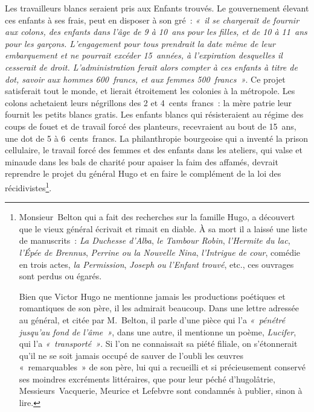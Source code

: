 \documentclass[french,twoside]{book} %
\begin{document}
Les travailleurs blancs seraient pris aux Enfants trouvés. Le gouvernement élevant ces enfants à ses frais, peut en disposer à son gré : \emph{« il se chargerait de fournir aux colons, des enfants dans l’âge de 9 à 10 ans pour les filles, et de 10 à 11 ans pour les garçons. L’engagement pour tous prendrait la date même de leur embarquement et ne pourrait excéder 15 années, à l’expiration desquelles il cesserait de droit. L’administration ferait alors compter à ces enfants à titre de dot, savoir aux hommes 600 francs, et aux femmes 500 francs »}. Ce projet satisferait tout le monde, et lierait étroitement les colonies à la métropole. Les colons achetaient leurs négrillons des 2 et 4 cents francs : la mère patrie leur fournit les petits blancs gratis. Les enfants blancs qui résisteraient au régime des coups de fouet et de travail forcé des planteurs, recevraient au bout de 15 ans, une dot de 5 à 6 cents francs. La philanthropie bourgeoise qui a inventé la  
\label{p22}prison cellulaire, le travail forcé des femmes et des enfants dans les ateliers, qui valse et minaude dans les bals de charité pour apaiser la faim des affamés, devrait reprendre le projet du général Hugo et en faire le complément de la loi des récidivistes\footnote{\noindent Monsieur Belton qui a fait des recherches sur la famille Hugo, a découvert que le vieux général écrivait et rimait en diable. À sa mort il a laissé une liste de manuscrits : \emph{La Duchesse d’Alba}, \emph{le Tambour Robin}, \emph{l’Hermite du lac}, \emph{l’Épée de Brennus}, \emph{Perrine ou la Nouvelle Nina}, \emph{l’Intrigue de cour}, comédie en trois actes, \emph{la Permission}, \emph{Joseph ou l’Enfant trouvé}, etc., ces ouvrages sont perdus ou égarés.\par
Bien que Victor Hugo ne mentionne jamais les productions poétiques et romantiques de son père, il les admirait beaucoup. Dans une lettre adressée au général, et citée par M. Belton, il parle d’une pièce qui l’a \emph{« pénétré jusqu’au fond de l’âme »}, dans une autre, il mentionne un poème, \emph{Lucifer}, qui l’a \emph{« transporté »}. Si l’on ne connaissait sa piété filiale, on s’étonnerait qu’il ne se soit jamais occupé de sauver de l’oubli les œuvres « remarquables » de son père, lui qui a recueilli et si précieusement conservé ses moindres excréments littéraires, que pour leur péché d’hugolâtrie, Messieurs Vacquerie, Meurice et Lefebvre sont condamnés à publier, sinon à lire.
}.
\end{document}
